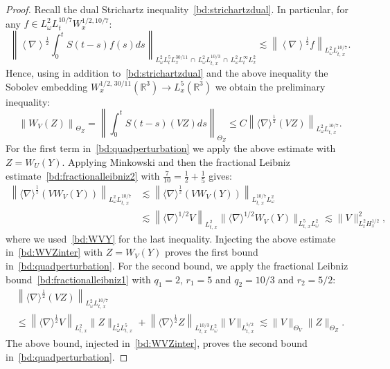 \documentclass[AHL, Unicode, longabstracts,published]{cedram}
\newcommand{\R}{\mathbb{R}}
\begin{document}
\begin{proof}
Recall the dual Strichartz inequality~\eqref{bd:strichartzdual}. In particular, for any $f\in L^2_\omega L^{10/7}_tW^{1/2,10/7}_x$:
\[
\left\| \left\langle \nabla \right\rangle^{\frac 12}\int_0^t S(t-s)f(s)ds\right\|_{L^2_\omega L^{5}_tL^{30/11}_x\,\cap\,L^2_\omega L^{10/3}_{t,\,x}\,\cap\,L^2_\omega L^{\infty}_t L^2_x}\lesssim \left\| \left\langle \nabla \right\rangle^{\frac 12}f \right\|_{ L^2_\omega L^{10/7}_{t,\,x}}.
\]
Hence, using in addition to~\eqref{bd:strichartzdual} and the above inequality the Sobolev embedding $W^{1/2,\,30/11}_x(\R^3)\rightarrow L^5_x(\R^3)$ we obtain the preliminary inequality:
\begin{equation} \label{bd:WVZinter}
\left\|W_V (Z)\right\|_{\Theta_Z}=\left\|\int_0^t S(t-s)(VZ)ds\right\|_{\Theta_Z} \leq C \left\| \langle \nabla \rangle^{\frac 12} (V Z)\right\|_{L^2_\omega L^{10/7}_{t,\,x}}.
\end{equation}
For the first term in~\eqref{bd:quadperturbation} we apply the above estimate with $Z=W_U(Y)$. Applying Minkowski and then the fractional Leibniz estimate~\eqref{bd:fractionalleibniz2} with $\tfrac7{10} = \tfrac12 + \tfrac15$ gives:
\begin{align*}
\left\| \langle \nabla \rangle^{\frac 12} \left(V W_V (Y)\right)\right\|_{L^2_\omega L^{10/7}_{t,\,x}}&\lesssim \left\| \langle \nabla \rangle^{\frac 12} \left(V W_V (Y)\right)\right\|_{L^{10/7}_{t,\,x}L^2_\omega} \\
&\lesssim \left\| \langle \nabla \rangle^{1/2} V \right\|_{L^2_{t,\,x}}\| \langle \nabla \rangle^{1/2} W_V (Y) \|_{L^5_{t,\,x}L^2_\omega} \lesssim \| V \|_{L^2_tH^{1/2}_x}^2,
\end{align*}
where we used~\eqref{bd:WVY} for the last inequality. Injecting the above estimate in~\eqref{bd:WVZinter} with $Z=W_V(Y)$ proves the first bound in~\eqref{bd:quadperturbation}. For the second bound, we apply the fractional Leibniz bound~\eqref{bd:fractionalleibniz1} with $q_1=2$, $r_1=5$ and $q_2=10/3$ and $r_2=5/2$:
\begin{multline*}
\left\| \langle \nabla \rangle^{\frac 12} (V Z)\right\|_{L^2_\omega L^{10/7}_{t,\,x}}\\
\leq \left\| \langle \nabla \rangle^{\frac 12} V \right\|_{L^{2}_{t,\,x}}\| Z \|_{L^2_\omega L^{5}_{t,\,x}}+\left\| \langle \nabla \rangle^{\frac 12} Z \right\|_{L^{10/3}_{t,\,x}L^2_\omega}\| V \|_{L^{5/2}_{t,\,x}}\lesssim \| V \|_{\Theta_V}\| Z\|_{\Theta_Z}.
\end{multline*}
The above bound, injected in~\eqref{bd:WVZinter}, proves the second bound in~\eqref{bd:quadperturbation}.
\end{proof}
\end{document}
